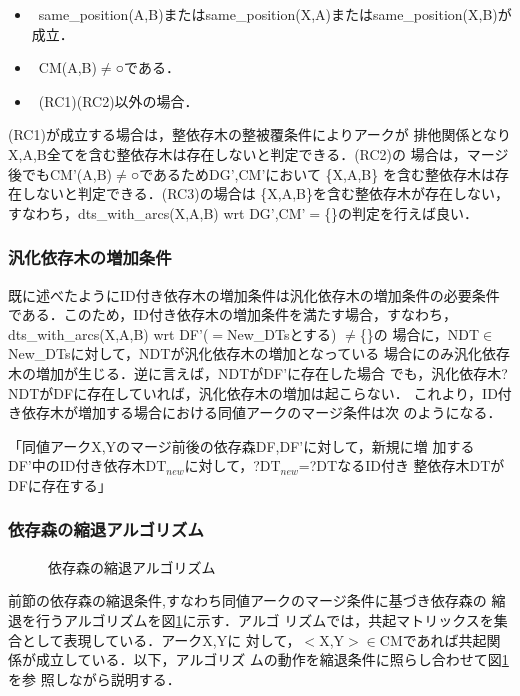 \begin{itemize}
\item[\myitemindent(RC1)]\ same\_position(A,B)またはsame\_position(X,A)またはsame\_position(X,B)が成立．
\item[\myitemindent(RC2)]\ CM(A,B)${\neq}$○である．
\item[\myitemindent(RC3)]\ (RC1)(RC2)以外の場合．
\end{itemize}

{\mynoindent}(RC1)が成立する場合は，整依存木の整被覆条件によりアークが
排他関係となりX,A,B全てを含む整依存木は存在しないと判定できる．(RC2)の
場合は，マージ後でもCM'(A,B)${\neq}$○であるためDG',CM'において
\{X,A,B\} を含む整依存木は存在しないと判定できる．(RC3)の場合は
\{X,A,B\}を含む整依存木が存在しない，すなわち，dts\_with\_arcs(X,A,B)
wrt DG',CM'$=$\{\}の判定を行えば良い．

\subsubsection{汎化依存木の増加条件}

既に述べたようにID付き依存木の増加条件は汎化依存木の増加条件の必要条件
である．このため，ID付き依存木の増加条件を満たす場合，すなわち，
dts\_with\_arcs(X,A,B) wrt DF'($=$New\_DTsとする) ${\neq}$\{\}の
場合に，NDT${\in}$New\_DTsに対して，NDTが汎化依存木の増加となっている
場合にのみ汎化依存木の増加が生じる．逆に言えば，NDTがDF'に存在した場合
でも，汎化依存木?NDTがDFに存在していれば，汎化依存木の増加は起こらない．
これより，ID付き依存木が増加する場合における同値アークのマージ条件は次
のようになる．

\mygapskip
{\mynoindent}「同値アークX,Yのマージ前後の依存森DF,DF'に対して，新規に増
加するDF'中のID付き依存木DT$_{new}$に対して，?DT$_{new}$=?DTなるID付き
整依存木DTがDFに存在する」
\mygapskip


\subsubsection{依存森の縮退アルゴリズム}

\begin{figure}[bt]
 \begin{center}
 \end{center}
\caption{依存森の縮退アルゴリズム}
\label{fig:DFReductionAlgorithm}
\end{figure}

前節の依存森の縮退条件,すなわち同値アークのマージ条件に基づき依存森の
縮退を行うアルゴリズムを図\ref{fig:DFReductionAlgorithm}に示す．アルゴ
リズムでは，共起マトリックスを集合として表現している．アークX,Yに
対して，$<$X,Y$>{\in}$CMであれば共起関係が成立している．以下，アルゴリズ
ムの動作を縮退条件に照らし合わせて図\ref{fig:DFReductionAlgorithm}を参
照しながら説明する．

